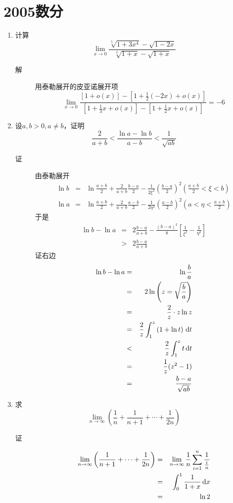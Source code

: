 \section{2005数分}
\begin{enumerate}
\item 计算
\[
\lim_{x \to 0} \frac{\sqrt[5]{1+3x^4}-\sqrt{1-2x}}{\sqrt[3]{1+x}-\sqrt{1+x}}
\]
\begin{description}
\item[解] 用泰勒展开的皮亚诺展开项
\[
\lim_{x\to 0}\frac{[1+o(x)]-[1+\frac{1}{2}(-2x)+o(x)]}{[1+\frac{1}{3}x+o(x)]-[1+\frac{1}{2}x+o(x)]}=-6
\]
\end{description}

\item 设$a,b > 0,a\neq b$，证明
\[
\frac{2}{a+b} < \frac{\ln a -\ln b}{a-b} < \frac{1}{\sqrt{ab}}
\]
\begin{description}
\item[证] 由泰勒展开
\begin{eqnarray*}
\ln b &=& \ln \frac{a+b}{2}+\frac{2}{a+b}\frac{b-a}{2}-\frac{1}{2\xi^2}\left(\frac{b-a}{2}\right)^2\left(\frac{a+b}{2}<\xi<b\right)\\
\ln a &=& \ln \frac{a+b}{2}+\frac{2}{a+b}\frac{a-b}{2}-\frac{1}{2\eta^2}\left(\frac{a-b}{2}\right)^2\left(a<\eta<\frac{a+b}{2}\right)
\end{eqnarray*}
于是
\begin{eqnarray*}
\ln b -\ln a&=&2\frac{b-a}{a+b}-\frac{(b-a)^2}{8}\left[\frac{1}{\xi^2}-\frac{1}{\eta^2}\right]\\
&>&2\frac{b-a}{a+b}
\end{eqnarray*}
证右边
\begin{eqnarray*}
\ln b -\ln a &=& \ln\frac{b}{a}\\
&=& 2\ln\left(z=\sqrt{\frac{b}{a}}\right)\\
&=& \frac{2}{z}\cdot z\ln z\\
&=& \frac{2}{z}\int_1^z\left(1+\ln t\right)\,\mathrm{d} t\\
&<& \frac{2}{z}\int_1^zt\,\mathrm{d} t\\
&=& \frac{1}{z}(z^2-1)\\
&=& \frac{b-a}{\sqrt{ab}}
\end{eqnarray*}
\end{description}

\item 求
\[
\lim_{n \to \infty}\left(\frac{1}{n} + \frac{1}{n+1}+\cdots +\frac{1}{2n}\right)
\]
\begin{description}
\item[证]
\begin{eqnarray*}
\lim_{n \to \infty}\left( \frac{1}{n+1}+\cdots +\frac{1}{2n}\right) &=&\lim_{n \to \infty}\frac{1}{n}\sum_{i=1}^n\frac{1}{\frac{i}{n}}\\
&=& \int_0^1 \frac{1}{1+x}\,\mathrm{d} x\\
&=& \ln 2
\end{eqnarray*}
\end{description}


\end{enumerate}
